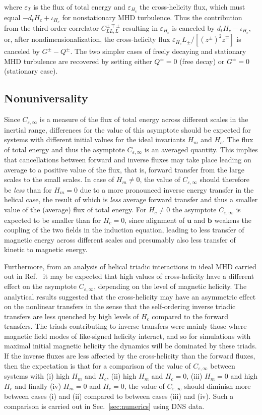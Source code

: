 \documentclass[aps,pre,onecolumn,superscriptaddress,notitlepage]{revtex4-1}
\newcommand{\Cinf}{C_{\varepsilon,\infty}}
\newcommand{\vep}{\varepsilon}
\renewcommand{\vec}[1]{\bm{#1}}
\begin{document}
where $\vep_T$ is the flux of total energy and $\vep_{H_c}$
the cross-helicity flux, which must equal $-d_t H_c + \iota_{H_c}$ 
for nonstationary MHD turbulence. Thus the
contribution from the third-order correlator $C_{LL,L}^{\pm\mp\pm}$
resulting in $\vep_{H_c}$ is canceled by $d_t H_c - \iota_{H_c}$, or,
after nondimensionalization, the cross-helicity flux
$\vep_{H_c} L_{\pm}/[(z^\pm)^2z^\mp]$ is canceled by $G^\pm-Q^\pm$.
The two simpler cases of freely decaying and stationary MHD turbulence are recovered by setting either $Q^\pm =0$ (free decay) or 
$G^{\pm} =0$ (stationary case).

\subsection{Nonuniversality} \label{sec:nonuniversality}
Since $\Cinf$ is a measure of the flux of total energy across different scales in
the inertial range, differences for the value of this asymptote should be
expected for systems with different initial values for the ideal invariants
$H_m$ and $H_c$.
The flux of total energy and thus the asymptote $\Cinf$ is an averaged quantity. This
implies that cancellations between forward and inverse fluxes may take place leading on average 
to a positive value of the flux, that is, forward transfer from the large scales to the small scales.  
In case of $H_m \neq 0$, the value of $\Cinf$ should
therefore be {\em less} than for $H_m=0$ due to a more pronounced inverse
energy transfer in the helical case, the result of which is {\em less} average forward transfer and
thus a smaller value of the (average) flux of total energy.
For $H_c \neq 0$ the asymptote $\Cinf$ is expected to be smaller than for $H_c =0$,
since alignment of $\vec{u}$ and $\vec{b}$ weakens the coupling
of the two fields in the induction equation, leading to less transfer
of magnetic energy across different scales and presumably also less transfer
of kinetic to magnetic energy.

Furthermore, from an analysis of helical triadic interactions in ideal MHD carried out in 
Ref.~\cite{Linkmann16a} it may be expected that 
high values of cross-helicity have a different effect on the asymptote $\Cinf$, 
depending on the level of magnetic helicity. The analytical results suggested that 
the cross-helicity may have an asymmetric effect on the nonlinear transfers in the sense
that the self-ordering inverse triadic transfers are less quenched by high levels of
$H_c$ compared to the forward transfers. The triads contributing to 
inverse transfers were mainly those where magnetic field modes of like-signed helicity interact, 
and so for simulations with maximal initial magnetic helicity the dynamics will be dominated
by these triads. If the inverse fluxes are less affected by the cross-helicity than the forward
fluxes, then the expectation is that for a comparison of the value of $\Cinf$ between 
systems with (i) high $H_m$ and $H_c$, (ii) high $H_m$ and $H_c=0$, (iii) $H_m=0$ and high $H_c$ and 
finally (iv) $H_m=0$ and $H_c=0$, the value of $\Cinf$ should diminish more between cases (i) and (ii) compared to 
between cases (iii) and (iv). Such a comparison is carried out in Sec.~\ref{sec:numerics} using DNS data.
 
\end{document}

